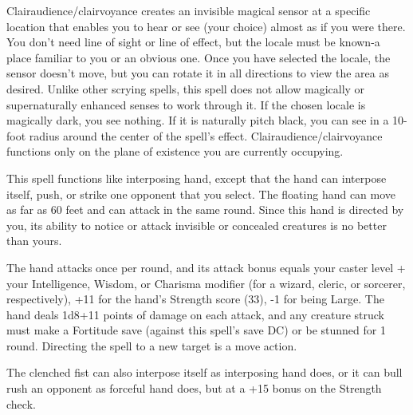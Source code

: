 \begin{multicols}{2}
\begin{small}
\noindent Clairaudience/clairvoyance creates an invisible magical sensor at a specific location that enables you to hear or see (your choice) almost as if you were there. You don't need line of sight or line of effect, but the locale must be known-a place familiar to you or an obvious one. Once you have selected the locale, the sensor doesn't move, but you can rotate it in all directions to view the area as desired. Unlike other scrying spells, this spell does not allow magically or supernaturally enhanced senses to work through it. If the chosen locale is magically dark, you see nothing. If it is naturally pitch black, you can see in a 10- foot radius around the center of the spell's effect. Clairaudience/clairvoyance functions only on the plane of existence you are currently occupying.


\noindent This spell functions like interposing hand, except that the hand can interpose itself, push, or strike one opponent that you select. The floating hand can move as far as 60 feet and can attack in the same round. Since this hand is directed by you, its ability to notice or attack invisible or concealed creatures is no better than yours.

\smallskip\noindent The hand attacks once per round, and its attack bonus equals your caster level + your Intelligence, Wisdom, or Charisma modifier (for a wizard, cleric, or sorcerer, respectively), +11 for the hand's Strength score (33), -1 for being Large. The hand deals 1d8+11 points of damage on each attack, and any creature struck must make a Fortitude save (against this spell's save DC) or be stunned for 1 round. Directing the spell to a new target is a move action.

\smallskip\noindent The clenched fist can also interpose itself as interposing hand does, or it can bull rush an opponent as forceful hand does, but at a +15 bonus on the Strength check.


\end{small}
\end{multicols}
